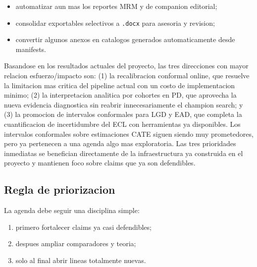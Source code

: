 \documentclass[
  spanish,
  11pt,
  letterpaper,
]{scrbook}
\providecommand{\tightlist}{%
  \setlength{\itemsep}{0pt}\setlength{\parskip}{0pt}}
\theoremstyle{plain}
\theoremstyle{remark}
\begin{document}
\begin{itemize}
\tightlist
\item
  automatizar aun mas los reportes MRM y de companion editorial;
\item
  consolidar exportables selectivos a \texttt{.docx} para asesoria y
  revision;
\item
  convertir algunos anexos en catalogos generados automaticamente desde
  manifests.
\end{itemize}

\begin{tcolorbox}[enhanced jigsaw, arc=.35mm, bottomrule=.15mm, bottomtitle=1mm, breakable, colback=white, colbacktitle=quarto-callout-note-color!10!white, colframe=quarto-callout-note-color-frame, coltitle=black, left=2mm, leftrule=.75mm, opacityback=0, opacitybacktitle=0.6, rightrule=.15mm, title=\textcolor{quarto-callout-note-color}{\faInfo}\hspace{0.5em}{Cuales direcciones son mas prometedoras}, titlerule=0mm, toprule=.15mm, toptitle=1mm]

Basandose en los resultados actuales del proyecto, las tres direcciones
con mayor relacion esfuerzo/impacto son: (1) la recalibracion conformal
online, que resuelve la limitacion mas critica del pipeline actual con
un costo de implementacion minimo; (2) la interpretacion analitica por
cohortes en PD, que aprovecha la nueva evidencia diagnostica sin reabrir
innecesariamente el champion search; y (3) la promocion de intervalos
conformales para LGD y EAD, que completa la cuantificacion de
incertidumbre del ECL con herramientas ya disponibles. Los intervalos
conformales sobre estimaciones CATE siguen siendo muy prometedores, pero
ya pertenecen a una agenda algo mas exploratoria. Las tres prioridades
inmediatas se benefician directamente de la infraestructura ya
construida en el proyecto y mantienen foco sobre claims que ya son
defendibles.

\end{tcolorbox}

\subsection{Regla de priorizacion}\label{regla-de-priorizacion}

La agenda debe seguir una disciplina simple:

\begin{enumerate}
\def\labelenumi{\arabic{enumi}.}
\tightlist
\item
  primero fortalecer claims ya casi defendibles;
\item
  despues ampliar comparadores y teoria;
\item
  solo al final abrir lineas totalmente nuevas.
\end{enumerate}
\end{document}
